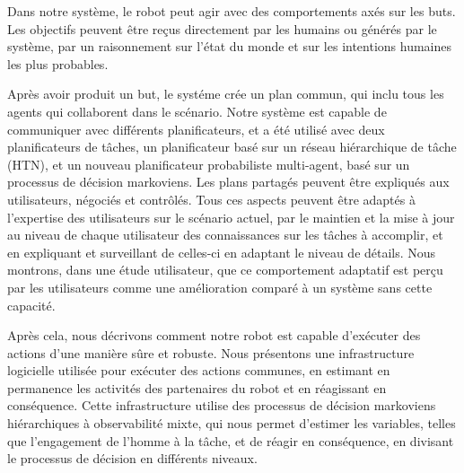 \documentclass[11pt, oneside]{Thesis} %
\begin{document}
{Dans notre système, le robot peut agir avec des comportements axés sur les buts. Les objectifs peuvent être reçus directement par les humains ou générés par le système, par un raisonnement sur l'état du monde et sur les intentions  humaines les plus probables. 

Après avoir produit un but, le systéme crée un plan commun, qui inclu tous les agents qui collaborent dans le scénario. Notre système est capable de communiquer avec différents planificateurs, et a été utilisé avec deux planificateurs de tâches, un planificateur basé sur un réseau hiérarchique de tâche (HTN), et un nouveau planificateur probabiliste multi-agent, basé sur un processus de décision markoviens. Les plans partagés peuvent être expliqués aux utilisateurs, négociés et contrôlés. Tous ces aspects peuvent être adaptés à l'expertise des utilisateurs sur le scénario actuel, par le maintien et la mise à jour au niveau de chaque utilisateur des connaissances sur les tâches à accomplir, et en expliquant et surveillant de celles-ci en adaptant le niveau de détails. Nous montrons, dans une étude utilisateur, que ce comportement adaptatif est perçu par les utilisateurs comme une amélioration comparé à un système sans cette capacité. 

Après cela, nous décrivons comment notre robot est capable d'exécuter des actions d'une manière sûre et robuste. Nous présentons une infrastructure logicielle utilisée pour exécuter des actions communes, en estimant en permanence les activités des partenaires du robot et en réagissant en conséquence. Cette infrastructure utilise des processus de décision markoviens hiérarchiques à observabilité mixte, qui nous permet d'estimer les variables, telles que l'engagement de l'homme à la tâche, et de réagir en conséquence, en divisant le processus de décision en différents niveaux. 
}

\clearpage %



\clearpage %
\end{document}
